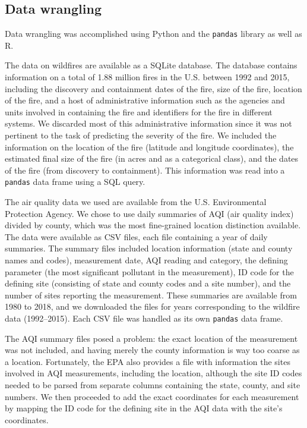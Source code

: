\documentclass[a4paper,12pt]{article}
\begin{document}

\subsection{Data wrangling}

Data wrangling was accomplished using Python and the \texttt{pandas} library as well as R.

The data on wildfires are available as a SQLite database. The database contains information on a total of 1.88 million fires in the U.S. between 1992 and 2015, including the discovery and containment dates of the fire, size of the fire, location of the fire, and a host of administrative information such as the agencies and units involved in containing the fire and identifiers for the fire in different systems. We discarded most of this administrative information since it was not pertinent to the task of predicting the severity of the fire. We included the information on the location of the fire (latitude and longitude coordinates), the estimated final size of the fire (in acres and as a categorical class), and the dates of the fire (from discovery to containment). This information was read into a \texttt{pandas} data frame using a SQL query.

The air quality data we used are available from the U.S. Environmental Protection Agency. We chose to use daily summaries of AQI (air quality index) divided by county, which was the most fine-grained location distinction available. The data were available as CSV files, each file containing a year of daily summaries. The summary files included location information (state and county names and codes), measurement date, AQI reading and category, the defining parameter (the most significant pollutant in the measurement), ID code for the defining site (consisting of state and county codes and a site number), and the number of sites reporting the measurement. These summaries are available from 1980 to 2018, and we downloaded the files for years corresponding to the wildfire data (1992–2015). Each CSV file was handled as its own \texttt{pandas} data frame.

The AQI summary files posed a problem: the exact location of the measurement was not included, and having merely the county information is way too coarse as a location. Fortunately, the EPA also provides a file with information the sites involved in AQI measurements, including the location, although the site ID codes needed to be parsed from separate columns containing the state, county, and site numbers. We then proceeded to add the exact coordinates for each measurement by mapping the ID code for the defining site in the AQI data with the site's coordinates.
\end{document}
